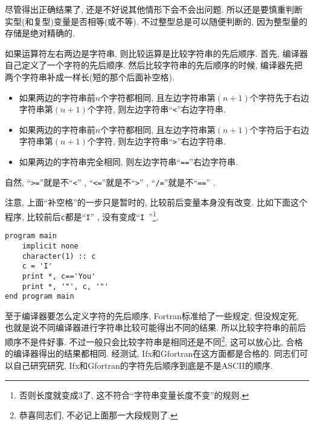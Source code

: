 尽管得出正确结果了, 还是不好说其他情形下会不会出问题. 所以还是要慎重判断实型(和复型)变量是否相等(或不等). 不过整型总是可以随便判断的, 因为整型量的存储是绝对精确的.

如果运算符左右两边是字符串, 则比较运算是比较字符串的先后顺序. 首先, 编译器自己定义了一个字符的先后顺序. 然后比较字符串的先后顺序的时候, 编译器先把两个字符串补成一样长(短的那个后面补空格).
\begin{itemize}
    \item 如果两边的字符串前$n$个字符都相同, 且左边字符串第$(n+1)$个字符先于右边字符串第$(n+1)$个字符, 则左边字符串``\texttt{<}''右边字符串.
    \item 如果两边的字符串前$n$个字符都相同, 且左边字符串第$(n+1)$个字符后于右边字符串第$(n+1)$个字符, 则左边字符串``\texttt{>}''右边字符串.
    \item 如果两边的字符串完全相同, 则左边字符串``\texttt{==}''右边字符串.
\end{itemize}
自然, ``\texttt{>=}''就是不``\texttt{<}'' , ``\texttt{<=}''就是不``\texttt{>}'' , ``\texttt{/=}''就是不``\texttt{==}'' .

注意, 上面``补空格''的一步只是暂时的, 比较前后变量本身没有改变. 比如下面这个程序, 比较前后\texttt{c}都是``\texttt{I}'' , 没有变成``\texttt{I  }''\footnote{
否则长度就变成3了, 这不符合``字符串变量长度不变''的规则.
}.
\begin{lstlisting}
program main
    implicit none
    character(1) :: c
    c = 'I'
    print *, c=='You'
    print *, '"', c, '"'
end program main
\end{lstlisting}

至于编译器要怎么定义字符的先后顺序, Fortran标准给了一些规定, 但没规定死, 也就是说不同编译器进行字符串比较可能得出不同的结果. 所以比较字符串的前后顺序不是件好事. 不过一般只会比较字符串是相同还是不同\footnote{
    恭喜同志们, 不必记上面那一大段规则了.
}, 这可以放心比, 合格的编译器得出的结果都相同. 经测试, Ifx和Gfortran在这方面都是合格的. 同志们可以自己研究研究, Ifx和Gfortran的字符先后顺序到底是不是ASCII的顺序.
